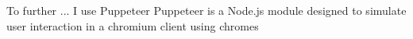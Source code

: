 To further ... I use Puppeteer
Puppeteer is a Node.js module designed to simulate user interaction in a chromium client using chromes 

% 
% 
% 
% 
% 
% 
% 
% 
% 

